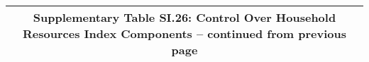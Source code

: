 \begin{longtable}{llcccccccccc}
\multicolumn{12}{c}{{\bfseries Supplementary Table SI.26: Control Over Household Resources Index Components -- continued from previous page}} \\ \hline                                                                                                                                                                                                                                                                                                                                                                                                                                                                                                                                                                                                                                                                                                                                   

\end{longtable}
